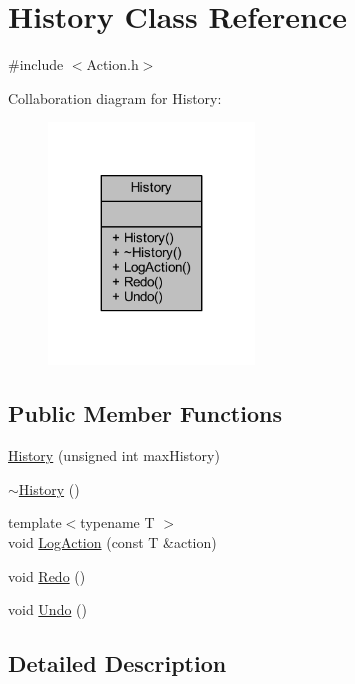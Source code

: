 \hypertarget{class_history}{}\section{History Class Reference}
\label{class_history}


{\ttfamily \#include $<$Action.\+h$>$}



Collaboration diagram for History\+:\nopagebreak
\begin{figure}[H]
\begin{center}
\leavevmode
\includegraphics[width=155pt]{class_history__coll__graph}
\end{center}
\end{figure}
\subsection*{Public Member Functions}
\begin{DoxyCompactItemize}
\item 
\hyperlink{class_history_afa52e652306d81e61acce4f6ebb9a04d}{History} (unsigned int max\+History)
\item 
\hyperlink{class_history_a5b00b64a1ddee04e60d5a3b517fd6d4c}{$\sim$\+History} ()
\item 
{\footnotesize template$<$typename T $>$ }\\void \hyperlink{class_history_ae2286b5c19bc1a5947caf33bdc5a39b0}{Log\+Action} (const T \&action)
\item 
void \hyperlink{class_history_abc639588fdca61df2902377e08a64dd6}{Redo} ()
\item 
void \hyperlink{class_history_a4cf63a4e996f75e5c3b99b42fe56c6d3}{Undo} ()
\end{DoxyCompactItemize}


\subsection{Detailed Description}


